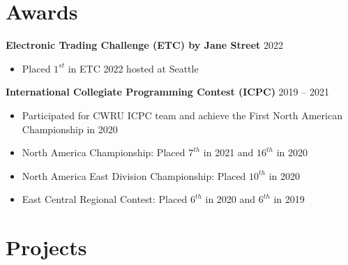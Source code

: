 \documentclass[11pt]{article}
\begin{document}
\section{Awards}

\hspace{10pt}\textbf{Electronic Trading Challenge (ETC) by Jane Street} \hfill {\small 2022}

\begin{itemize}[leftmargin=31pt]
\vspace{-10pt}
\setlength\itemsep{-5pt}
    \item {\small Placed $1^{st}$ in ETC 2022 hosted at Seattle}
    \vspace{-7pt}
\end{itemize}

\hspace{10pt}\textbf{International Collegiate Programming Contest (ICPC)} \hfill {\small 2019 -- 2021}
\begin{itemize}[leftmargin=31pt]
\vspace{-10pt}
\setlength\itemsep{-5pt}
    \item {\small Participated for CWRU ICPC team and achieve the First North American Championship in 2020}
    \item {\small North America Championship: Placed $7^{th}$ in 2021 and $16^{th}$ in 2020}
    \item {\small North America East Division Championship: Placed $10^{th}$ in 2020}
    \item {\small East Central Regional Contest: Placed $6^{th}$ in 2020 and $6^{th}$ in 2019}
    \vspace{-7pt}
\end{itemize}

\section{Projects}

\end{document}
